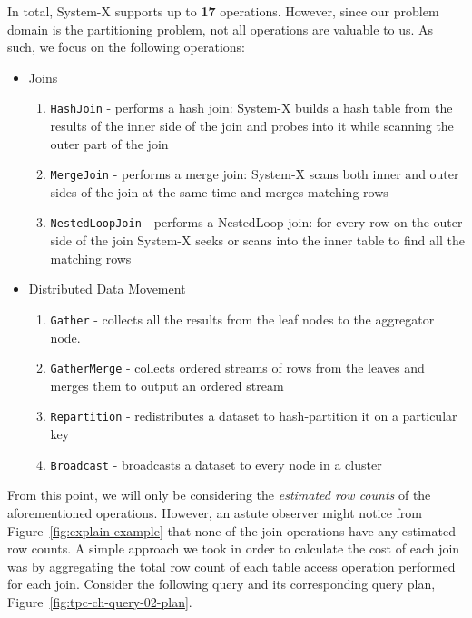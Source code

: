 In total, System-X supports up to \textbf{17} operations. However, since our problem domain is the partitioning problem, not all operations are valuable to us. As such, we focus on the following operations:
\begin{itemize}
        \item Joins
        \begin{enumerate}
            \item \texttt{HashJoin} - performs a hash join: System-X builds a hash table from the results of the inner side of the join and probes into it while scanning the outer part of the join
            \item \texttt{MergeJoin} - performs a merge join: System-X scans both inner and outer sides of the join at the same time and merges matching rows
            \item \texttt{NestedLoopJoin} - performs a NestedLoop join: for every row on the outer side of the join System-X seeks or scans into the inner table to find all the matching rows
        \end{enumerate}
        \item Distributed Data Movement
        \begin{enumerate}
            \item \texttt{Gather} - collects all the results from the leaf nodes to the aggregator node. 
            \item \texttt{GatherMerge} - collects ordered streams of rows from the leaves and merges them to output an ordered stream
            \item \texttt{Repartition} - redistributes a dataset to hash-partition it on a particular key
            \item \texttt{Broadcast} - broadcasts a dataset to every node in a cluster
        \end{enumerate}
\end{itemize}
From this point, we will only be considering the \textit{estimated row counts} of the aforementioned operations. However, an astute observer might notice from Figure~\ref{fig:explain-example} that none of the join operations have any estimated row counts. A simple approach we took in order to calculate the cost of each join was by aggregating the total row count of each table access operation performed for each join. Consider the following query and its corresponding query plan, Figure~\ref{fig:tpc-ch-query-02-plan}.


